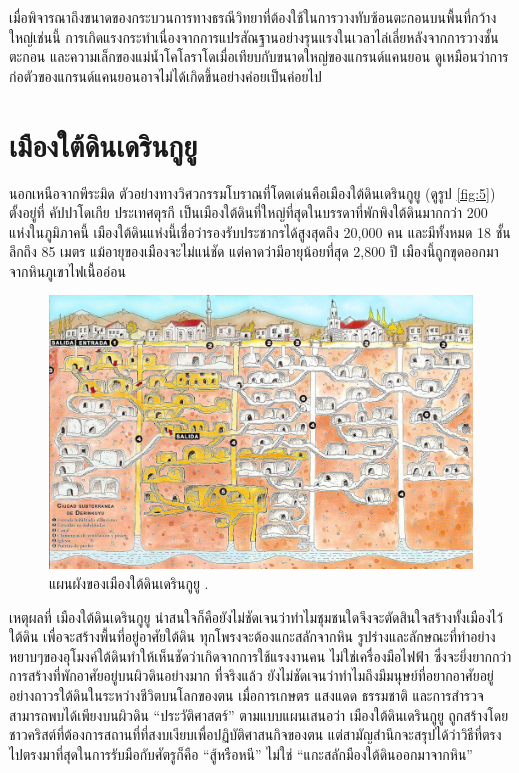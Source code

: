 \documentclass[10pt,twocolumn,letterpaper]{article}
\begin{document}
เมื่อพิจารณาถึงขนาดของกระบวนการทางธรณีวิทยาที่ต้องใช้ในการวางทับซ้อนตะกอนบนพื้นที่กว้างใหญ่เช่นนี้ การเกิดแรงกระทำเนื่องจากการแปรสัณฐานอย่างรุนแรงในเวลาไล่เลี่ยหลังจากการวางชั้นตะกอน และความเล็กของแม่น้ำโคโลราโดเมื่อเทียบกับขนาดใหญ่ของแกรนด์แคนยอน ดูเหมือนว่าการก่อตัวของแกรนด์แคนยอนอาจไม่ได้เกิดขึ้นอย่างค่อยเป็นค่อยไป

\section{เมืองใต้ดินเดรินกูยู}

นอกเหนือจากพีระมิด ตัวอย่างทางวิศวกรรมโบราณที่โดดเด่นคือเมืองใต้ดินเดรินกูยู (ดูรูป \ref{fig:5}) ตั้งอยู่ที่ คัปปาโดเกีย ประเทศตุรกี เป็นเมืองใต้ดินที่ใหญ่ที่สุดในบรรดาที่พักพิงใต้ดินมากกว่า 200 แห่งในภูมิภาคนี้ \cite{54} เมืองใต้ดินแห่งนี้เชื่อว่ารองรับประชากรได้สูงสุดถึง 20,000 คน และมีทั้งหมด 18 ชั้น ลึกถึง 85 เมตร แม้อายุของเมืองจะไม่แน่ชัด แต่คาดว่ามีอายุน้อยที่สุด 2,800 ปี เมืองนี้ถูกขุดออกมาจากหินภูเขาไฟเนื้ออ่อน \cite{52, 53}

\begin{figure}[b]
\begin{center}

   \includegraphics[width=1\linewidth]{derinkuyu.jpeg}
\end{center}
   \caption{แผนผังของเมืองใต้ดินเดรินกูยู \cite{56}.}
\label{fig:5}
\label{fig:onecol}
\end{figure}

เหตุผลที่ เมืองใต้ดินเดรินกูยู น่าสนใจก็คือยังไม่ชัดเจนว่าทำไมชุมชนใดจึงจะตัดสินใจสร้างทั้งเมืองไว้ใต้ดิน เพื่อจะสร้างพื้นที่อยู่อาศัยใต้ดิน ทุกโพรงจะต้องแกะสลักจากหิน รูปร่างและลักษณะที่ทำอย่างหยาบๆของอุโมงค์ใต้ดินทำให้เห็นชัดว่าเกิดจากการใช้แรงงานคน ไม่ใช่เครื่องมือไฟฟ้า ซึ่งจะยิ่งยากกว่าการสร้างที่พักอาศัยอยู่บนผิวดินอย่างมาก ที่จริงแล้ว ยังไม่ชัดเจนว่าทำไมถึงมีมนุษย์ที่อยากอาศัยอยู่อย่างถาวรใต้ดินในระหว่างชีวิตบนโลกของตน เมื่อการเกษตร แสงแดด ธรรมชาติ และการสำรวจสามารถพบได้เพียงบนผิวดิน “ประวัติศาสตร์” ตามแบบแผนเสนอว่า เมืองใต้ดินเดรินกูยู ถูกสร้างโดยชาวคริสต์ที่ต้องการสถานที่ที่สงบเงียบเพื่อปฏิบัติศาสนกิจของตน \cite{53} แต่สามัญสำนึกจะสรุปได้ว่าวิธีที่ตรงไปตรงมาที่สุดในการรับมือกับศัตรูก็คือ “สู้หรือหนี” ไม่ใช่ “แกะสลักมืองใต้ดินออกมาจากหิน”
\end{document}
